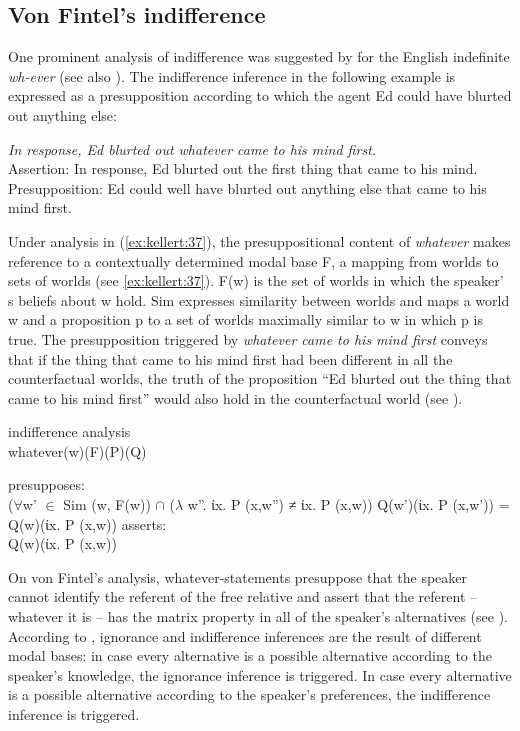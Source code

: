 \documentclass[output=paper]{langsci/langscibook}
\begin{document}
\subsection{Von Fintel’s indifference}\label{sec:kellert:3.1}
One prominent analysis of indifference was suggested by \citet{Fintel2000} for the English indefinite \textit{wh-ever} (see also \citealt{Condoravdi2005}). The indifference inference in the following example is expressed as a presupposition according to which the agent Ed could have blurted out anything else:

\ea\label{ex:kellert:36} 
    \textit{In response, Ed blurted out whatever came to his mind first.}\\
	Assertion: In response, Ed blurted out the first thing that came to his mind.\\
	Presupposition: Ed could well have blurted out anything else that came to his mind first.
\z

Under  analysis in (\ref{ex:kellert:37}), the presuppositional content of \textit{whatever} makes reference to a contextually determined modal base F, a mapping from worlds to sets of worlds (see \ref{ex:kellert:37}). F(w) is the set of worlds in which the speaker' s beliefs about w hold. Sim expresses similarity between worlds and maps a world w and a proposition p to a set of worlds maximally similar to w in which p is true. The presupposition triggered by \textit{whatever came to his mind first} conveys that if the thing that came to his mind first had been different in all the counterfactual worlds, the truth of the proposition “Ed blurted out the thing that came to his mind first” would also hold in the counterfactual world (see \citealt{Condoravdi2005}).

\ea\label{ex:kellert:37} indifference analysis \citep{Fintel2000}\\
whatever(w)(F)(P)(Q)
\begin{xlist}
\ex presupposes:\\
{($\forall$w’ $\in$ Sim (w, F(w)) $\cap$ ($\lambda$ w”. ίx. P (x,w”) ≠ ίx. P (x,w))
	Q(w’)(ίx. P (x,w’)) = Q(w)(ίx. P (x,w))}
\ex	asserts:\\
{Q(w)(ίx. P (x,w))}
\end{xlist}
\z

On von Fintel’s analysis, whatever-statements presuppose that the speaker cannot identify the referent of the free relative and assert that the referent -- whatever it is -- has the matrix property in all of the speaker's alternatives (see \citealt{Condoravdi2005}). According to \cite{Fintel2000}, ignorance and indifference inferences are the result of different modal bases: in case every alternative is a possible alternative according to the speaker’s knowledge, the ignorance inference is triggered. In case every alternative is a possible alternative according to the speaker's preferences, the indifference inference is triggered.
\end{document}
